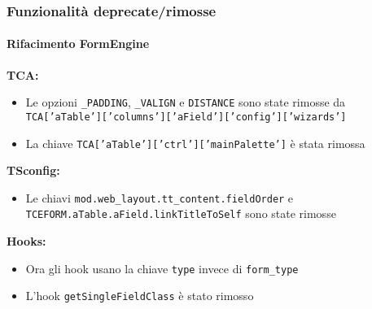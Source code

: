 \begin{frame}[fragile]
	\frametitle{Funzionalità deprecate/rimosse}
	\framesubtitle{Rifacimento FormEngine}

		\textbf{TCA:}

			\small
			\begin{itemize}

				\item Le opzioni \texttt{\_PADDING}, \texttt{\_VALIGN} e \texttt{DISTANCE}
					sono state rimosse da
					\texttt{TCA['aTable']['columns']['aField']['config']['wizards']}

				\item La chiave \texttt{TCA['aTable']['ctrl']['mainPalette']} è stata rimossa

			\end{itemize}

		\textbf{TSconfig:}

			\small
			\begin{itemize}
				\item Le chiavi \texttt{mod.web\_layout.tt\_content.fieldOrder} e
					\texttt{TCEFORM.aTable.aField.linkTitleToSelf} sono state rimosse
			\end{itemize}

		\textbf{Hooks:}

			\small
			\begin{itemize}
				\item Ora gli hook usano la chiave \texttt{type} invece di \texttt{form\_type} 
				\item L'hook \texttt{getSingleFieldClass} è stato rimosso
			\end{itemize}

\end{frame}


